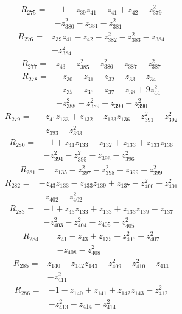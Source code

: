 \begin{align*}
R_{275}={}&-1-z_{39}z_{41}+z_{41}+z_{42}-z_{379}^{2}\\
&-z_{380}^{2}-z_{381}-z_{381}^{2}
\end{align*}
\begin{align*}
R_{276}={}&z_{39}z_{41}-z_{42}-z_{382}^{2}-z_{383}^{2}-z_{384}\\
&-z_{384}^{2}
\end{align*}
\begin{align*}
R_{277}={}&z_{43}-z_{385}^{2}-z_{386}^{2}-z_{387}-z_{387}^{2}
\end{align*}
\begin{align*}
R_{278}={}&-z_{30}-z_{31}-z_{32}-z_{33}-z_{34}\\
&-z_{35}-z_{36}-z_{37}-z_{38}+9z_{44}^{2}\\
&-z_{388}^{2}-z_{389}^{2}-z_{390}-z_{390}^{2}
\end{align*}
\begin{align*}
R_{279}={}&-z_{41}z_{133}+z_{132}-z_{133}z_{136}-z_{391}^{2}-z_{392}^{2}\\
&-z_{393}-z_{393}^{2}
\end{align*}
\begin{align*}
R_{280}={}&-1+z_{41}z_{133}-z_{132}+z_{133}+z_{133}z_{136}\\
&-z_{394}^{2}-z_{395}^{2}-z_{396}-z_{396}^{2}
\end{align*}
\begin{align*}
R_{281}={}&z_{135}-z_{397}^{2}-z_{398}^{2}-z_{399}-z_{399}^{2}
\end{align*}
\begin{align*}
R_{282}={}&-z_{43}z_{133}-z_{133}z_{139}+z_{137}-z_{400}^{2}-z_{401}^{2}\\
&-z_{402}-z_{402}^{2}
\end{align*}
\begin{align*}
R_{283}={}&-1+z_{43}z_{133}+z_{133}+z_{133}z_{139}-z_{137}\\
&-z_{403}^{2}-z_{404}^{2}-z_{405}-z_{405}^{2}
\end{align*}
\begin{align*}
R_{284}={}&z_{41}-z_{43}+z_{135}-z_{406}^{2}-z_{407}^{2}\\
&-z_{408}-z_{408}^{2}
\end{align*}
\begin{align*}
R_{285}={}&z_{140}-z_{142}z_{143}-z_{409}^{2}-z_{410}^{2}-z_{411}\\
&-z_{411}^{2}
\end{align*}
\begin{align*}
R_{286}={}&-1-z_{140}+z_{141}+z_{142}z_{143}-z_{412}^{2}\\
&-z_{413}^{2}-z_{414}-z_{414}^{2}
\end{align*}

